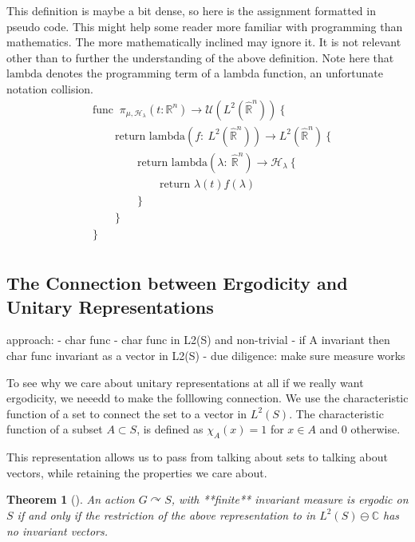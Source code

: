 \documentclass[
  12pt
]{article}
\theoremstyle{break}
\newtheorem{thm}{Theorem}
\theoremstyle{plain}
\begin{document}
  This definition is maybe a bit dense, so here is the assignment formatted in
  pseudo code. This might help some reader more familiar with programming than
  mathematics. The more mathematically inclined may ignore it. It is not
  relevant other than to further the understanding of the above definition.
  Note here that $\text{lambda}$ denotes the programming term of a lambda
  function, an unfortunate notation collision.
  \begin{align*}
  & \text{func }\ \pi_{\mu,\mathscr{H}_{\lambda}}(t: \mathbb{R}^n) \rightarrow \mathcal{U}(L^2(\hat{\mathbb{R}}^n)) \ \{ \\
  & \qquad \text{return lambda}(f:\ L^2(\hat{\mathbb{R}}^n)) \rightarrow L^2(\hat{\mathbb{R}}^n) \ \{ \\
  & \qquad \qquad \text{return lambda}(\lambda:\ \hat{\mathbb{R}}^n) \rightarrow \mathscr{H}_{\lambda} \ \{ \\
  & \qquad \qquad \qquad \text{return }\lambda(t)f(\lambda) \\
  & \qquad \qquad \} \\
  & \qquad \} \\
  & \} \\
  \end{align*}

  \hypertarget{the-connection-between-ergodicity-and-unitary-representations}{%
  \subsection{The Connection between Ergodicity and Unitary Representations}\label{the-connection-between-ergodicity-and-unitary-representations}}

  approach: - char func - char func in L2(S) and non-trivial - if A
  invariant then char func invariant as a vector in L2(S) - due diligence:
  make sure measure works

  To see why we care about unitary representations at all if we really
  want ergodicity, we neeedd to make the folllowing connection. We use the
  characteristic function of a set to connect the set to a vector in
  $L^2(S)$. The characteristic function of a subset $A\subset S$, is
  defined as $\chi_A(x) = 1$ for $x \in A$ and $0$ otherwise.

  This representation allows us to pass from talking about sets to talking
  about vectors, while retaining the properties we care about.

  \begin{thm}[]
    An action $G\curvearrowright S$, with **finite** invariant measure is ergodic
    on $S$ if and only if the restriction of the above representation to  in
    $L^2(S) \ominus \mathbb{C}$ has no invariant vectors.
  \end{thm}
    
\end{document}
